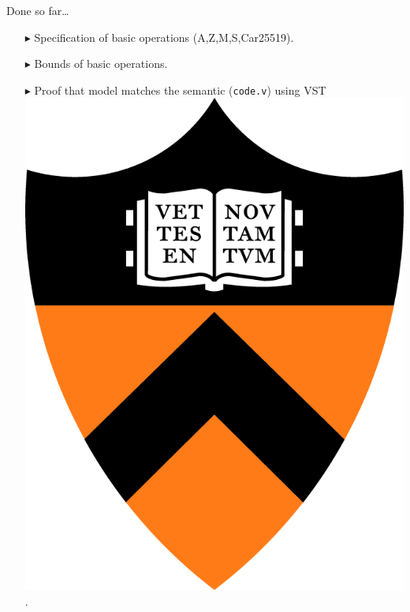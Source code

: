 \documentclass[8pt]{beamer}
\begin{document}
\begin{frame}[fragile]{Done so far\ldots}
    \begin{itemize}
      \item[\color{ruDarkTeal}$\blacktriangleright$] Specification of basic operations (A,Z,M,S,Car25519).
      \item[\color{ruDarkTeal}$\blacktriangleright$] Bounds of basic operations.
      \item[\color{ruDarkTeal}$\blacktriangleright$] Proof that model matches the semantic (\texttt{code.v}) using VST \includegraphics[height=\fontcharht\font`\B]{princeton-logo}.
    \end{itemize}


\end{frame}
\end{document}
